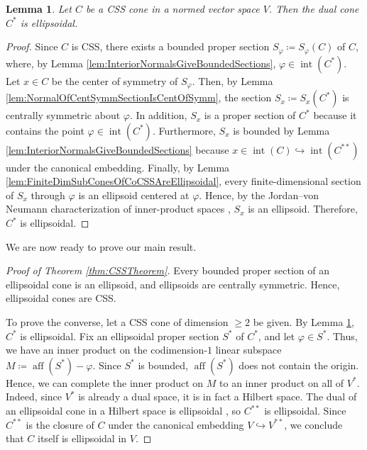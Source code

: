\documentclass[10pt]{amsart}
\newtheorem{lemma}[thm]{Lemma}
\theoremstyle{definition}
\theoremstyle{remark}
\begin{document}
\begin{lemma}
   \label{lem:DualsOfCSSConesAreEllipsoidal}
   Let $C$ be a CSS cone in a normed vector space $V$.  Then the
   dual cone ${C^{\ast}}$ is ellipsoidal.
\end{lemma}

\begin{proof}
   Since $C$ is CSS, there exists a bounded proper section
   $S_{\varphi} {\mathrel{\coloneqq}} S_{\varphi}(C)$ of $C$, where, by Lemma
   \ref{lem:InteriorNormalsGiveBoundedSections}, ${\varphi} \in
   {\operatorname{int}}({C^{\ast}})$.  Let $x \in C$ be the center of symmetry of
   $S_{\varphi}$.  Then, by Lemma
   \ref{lem:NormalOfCentSymmSectionIsCentOfSymm}, the section
   $S_{x} {\mathrel{\coloneqq}} S_{x}({C^{\ast}})$ is centrally symmetric about
   ${\varphi}$.  In addition, $S_{x}$ is a proper section of ${C^{\ast}}$
   because it contains the point ${\varphi} \in {\operatorname{int}}({C^{\ast}})$.
   Furthermore, $S_{x}$ is bounded by Lemma
   \ref{lem:InteriorNormalsGiveBoundedSections} because $x \in
   {\operatorname{int}}(C) \hookrightarrow {\operatorname{int}}({C^{\ast\ast}})$ under the canonical
   embedding.  Finally, by Lemma
   \ref{lem:FiniteDimSubConesOfCoCSSAreEllipsoidal}, every
   finite-dimensional section of $S_{x}$ through ${\varphi}$ is an
   ellipsoid centered at ${\varphi}$.  Hence, by the Jordan--von
   Neumann characterization of inner-product spaces
   \cite{JorvNeu1935}, $S_{x}$ is an ellipsoid.  Therefore, ${C^{\ast}}$ is ellipsoidal.
\end{proof}

We are now ready to prove our main result.

\begin{proof}[Proof of Theorem \ref{thm:CSSTheorem}]
   \label{proof:CSSproof}
   Every bounded proper section of an ellipsoidal cone is an 
   ellipsoid, and ellipsoids are centrally symmetric.  Hence, 
   ellipsoidal cones are CSS.
   
   To prove the converse, let a CSS cone of dimension $\ge 2$ be
   given.  By Lemma \ref{lem:DualsOfCSSConesAreEllipsoidal},
   ${{C}^{\ast}}$ is ellipsoidal.  Fix an ellipsoidal proper section
   ${{S}^{\ast}}$ of ${{C}^{\ast}}$, and let ${\varphi} \in {{S}^{\ast}}$.  Thus,
   we have an inner product on the codimension-$1$ linear subspace
   $M {\mathrel{\coloneqq}} \operatorname{aff}({{S}^{\ast}}) - {\varphi}$.  Since ${{S}^{\ast}}$ is
   bounded, $\operatorname{aff}({{S}^{\ast}})$ does not contain the origin.  Hence,
   we can complete the inner product on $M$ to an inner product on
   all of ${{V}^{\ast}}$.  Indeed, since ${{V}^{\ast}}$ is already a dual
   space, it is in fact a Hilbert space.  The dual of an
   ellipsoidal cone in a Hilbert space is ellipsoidal
   \cite[p.~51]{Krein}, so ${{C}^{\ast\ast}}$ is ellipsoidal.  Since
   ${{C}^{\ast\ast}}$ is the closure of $C$ under the canonical embedding
   $V \hookrightarrow {{V}^{\ast\ast}}$, we conclude that $C$ itself is
   ellipsoidal in $V$.
\end{proof}
\end{document}
